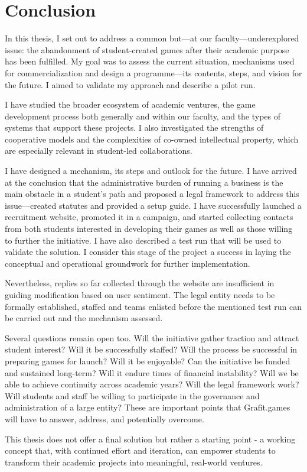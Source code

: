 \chapter*{Conclusion}
In this thesis, I set out to address a common but—at our faculty—underexplored issue: the abandonment of student-created games after their academic purpose has been fulfilled. My goal was to assess the current situation, mechanisms used for commercialization and design a programme—its contents, steps, and vision for the future. I aimed to validate my approach and describe a pilot run.

I have studied the broader ecosystem of academic ventures, the game development process both generally and within our faculty, and the types of systems that support these projects. I also investigated the strengths of cooperative models and the complexities of co-owned intellectual property, which are especially relevant in student-led collaborations.

I have designed a mechanism, its steps and outlook for the future. I have arrived at the conclusion that the administrative burden of running a business is the main obstacle in a student’s path and proposed a legal framework to address this issue—created statutes and provided a setup guide. I have successfully launched a recruitment website, promoted it in a campaign, and started collecting contacts from both students interested in developing their games as well as those willing to further the initiative. I have also described a test run that will be used to validate the solution. I consider this stage of the project a success in laying the conceptual and operational groundwork for further implementation.

Nevertheless, replies so far collected through the website are insufficient in guiding modification based on user sentiment. The legal entity needs to be formally established, staffed and teams enlisted before the mentioned test run can be carried out and the mechanism assessed.

Several questions remain open too. Will the initiative gather traction and attract student interest? Will it be successfully staffed? Will the process be successful in preparing games for launch? Will it be enjoyable? Can the initiative be funded and sustained long-term? Will it endure times of financial instability? Will we be able to achieve continuity across academic years? Will the legal framework work? Will students and staff be willing to participate in the governance and administration of a large entity? These are important points that Grafit.games will have to answer, address, and potentially overcome.

This thesis does not offer a final solution but rather a starting point - a working concept that, with continued effort and iteration, can empower students to transform their academic projects into meaningful, real-world ventures.
